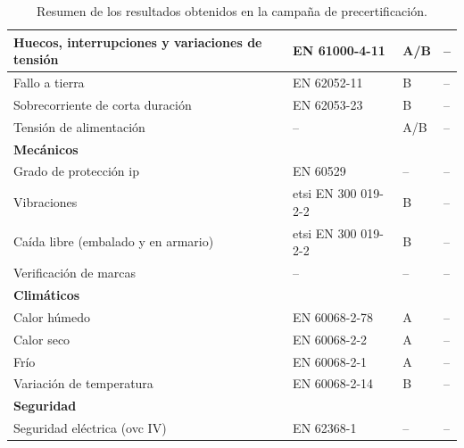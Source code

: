 \begin{table}[!h]
\begin{tabular}{|p{6.4cm}|p{3.4cm}|p{1.6cm}|p{2.4cm}|}
Huecos, interrupciones y variaciones de tensión & EN 61000-4-11 & A/B & -- \\ \hline
Fallo a tierra & EN 62052-11 & B & -- \\ \hline
Sobrecorriente de corta duración & EN 62053-23 & B & -- \\ \hline
Tensión de alimentación & -- & A/B & -- \\ \hline
\multicolumn{4}{|l|}{\textbf{Mecánicos}} \\ \hline
Grado de protección \gls{ip} & EN 60529 & -- & -- \\ \hline
Vibraciones & \gls{etsi} EN 300 019-2-2 & B & -- \\ \hline
Caída libre (embalado y en armario) & \gls{etsi} EN 300 019-2-2 & B & -- \\ \hline
Verificación de marcas & -- & -- & -- \\ \hline
\multicolumn{4}{|l|}{\textbf{Climáticos}} \\ \hline
Calor húmedo & EN 60068-2-78 & A & -- \\ \hline
Calor seco & EN 60068-2-2 & A & -- \\ \hline
Frío & EN 60068-2-1 & A & -- \\ \hline
Variación de temperatura & EN 60068-2-14 & B & -- \\ \hline
\multicolumn{4}{|l|}{\textbf{Seguridad}} \\ \hline
Seguridad eléctrica (\gls{ovc} IV) & EN 62368-1 & -- & -- \\ \hline
\end{tabular}
\caption{Resumen de los resultados obtenidos en la campaña de precertificación.}
\label{tab:resumen_resultados_precert}
\end{table}
